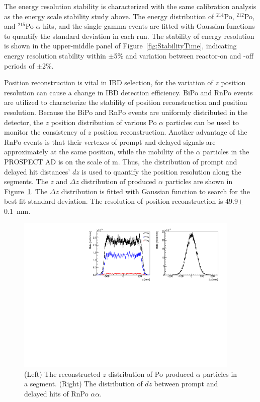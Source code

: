 
The energy resolution stability is characterized with the same calibration analysis as the energy scale stability study above.
The energy distribution of $^{214}$Po, $^{212}$Po, and $^{215}$Po $\alpha$ hits, and the single gamma events are fitted with Gaussian functions to quantify the standard deviation in each run. 
The stability of energy resolution is shown in the upper-middle panel of Figure~\ref{fig:StabilityTime}, indicating energy resolution stability within $\pm$5\% and variation between reactor-on and -off periods of $\pm$2\%.


Position reconstruction is vital in IBD selection, for the variation of $z$ position resolution can cause a change in IBD detection efficiency.
BiPo and RnPo events are utilized to characterize the stability of position reconstruction and position resolution.
Because the BiPo and RnPo events are uniformly distributed in the detector, the $z$ position distribution of various Po $\alpha$ particles can be used to monitor the consistency of $z$ position reconstruction.
Another advantage of the RnPo events is that their vertexes of prompt and delayed signals are approximately at the same position, while the mobility of the $\alpha$ particles in the PROSPECT AD is on the scale of \textmu m.
Thus, the distribution of prompt and delayed hit distances' $dz$ is used to quantify the position resolution along the segments.
The $z$ and $\Delta z$ distribution of produced $\alpha$ particles are shown in Figure~\ref{fig:ZReco}.
The $\Delta z$ distribution is fitted with Gaussian function to search for the best fit standard deviation.
The resolution of position reconstruction is 49.9$\pm$0.1~mm.
\begin{figure}[h!]
\centering
\includegraphics[width=0.95\textwidth]{Figures/PosDist.pdf}
\caption[Distributions of $z$ and $dz$ of Po decayed $\alpha$ ]{
(Left) The reconstructed $z$ distribution of Po produced $\alpha$ particles in a segment.
(Right) The distribution of $dz$ between prompt and delayed hits of RnPo $\alpha\alpha$.}
\label{fig:ZReco}
\end{figure}

